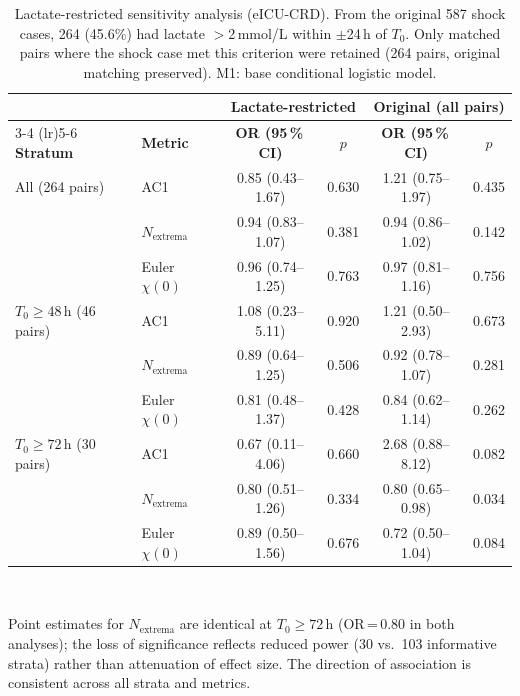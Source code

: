 \documentclass[12pt,a4paper]{article}
\newcommand{\Tzero}{$T_0$}
\begin{document}
\begin{table}[htbp]
  \centering
  \caption{Lactate-restricted sensitivity analysis (eICU-CRD).
  From the original 587 shock cases, 264 (45.6\%) had lactate
  $>$2\,mmol/L within $\pm$24\,h of \Tzero.
  Only matched pairs where the shock case met this criterion were retained
  (264 pairs, original matching preserved).
  M1: base conditional logistic model.}
  \label{tab:lactate-sens}
  \small
  \begin{tabular}{llcccc}
    \toprule
    & & \multicolumn{2}{c}{\textbf{Lactate-restricted}} &
      \multicolumn{2}{c}{\textbf{Original (all pairs)}} \\
    \cmidrule(lr){3-4} \cmidrule(lr){5-6}
    \textbf{Stratum} & \textbf{Metric} &
      \textbf{OR (95\,\%\,CI)} & \textbf{$p$} &
      \textbf{OR (95\,\%\,CI)} & \textbf{$p$} \\
    \midrule
    All (264 pairs)
      & AC1           & 0.85 (0.43--1.67) & 0.630  & 1.21 (0.75--1.97) & 0.435 \\
      & $N_{\text{extrema}}$ & 0.94 (0.83--1.07) & 0.381 & 0.94 (0.86--1.02) & 0.142 \\
      & Euler $\chi(0)$ & 0.96 (0.74--1.25) & 0.763 & 0.97 (0.81--1.16) & 0.756 \\
    \midrule
    $T_0\geq48$\,h (46 pairs)
      & AC1           & 1.08 (0.23--5.11) & 0.920  & 1.21 (0.50--2.93) & 0.673 \\
      & $N_{\text{extrema}}$ & 0.89 (0.64--1.25) & 0.506 & 0.92 (0.78--1.07) & 0.281 \\
      & Euler $\chi(0)$ & 0.81 (0.48--1.37) & 0.428 & 0.84 (0.62--1.14) & 0.262 \\
    \midrule
    $T_0\geq72$\,h (30 pairs)
      & AC1           & 0.67 (0.11--4.06) & 0.660  & 2.68 (0.88--8.12) & 0.082 \\
      & $N_{\text{extrema}}$ & 0.80 (0.51--1.26) & 0.334 & 0.80 (0.65--0.98) & 0.034 \\
      & Euler $\chi(0)$ & 0.89 (0.50--1.56) & 0.676 & 0.72 (0.50--1.04) & 0.084 \\
    \bottomrule
  \end{tabular}
  \vspace{2pt}\\
  \raggedright\footnotesize
  Point estimates for $N_{\text{extrema}}$ are identical at $T_0\geq72$\,h
  (OR\,=\,0.80 in both analyses); the loss of significance reflects reduced
  power (30 vs.\ 103 informative strata) rather than attenuation of effect size.
  The direction of association is consistent across all strata and metrics.
\end{table}
\end{document}
